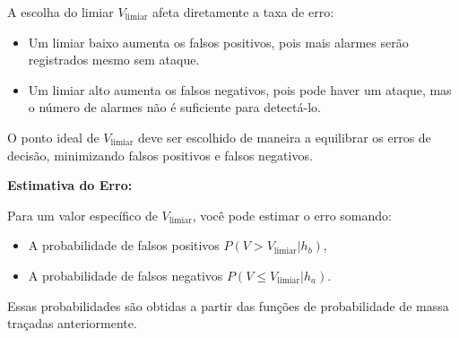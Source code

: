 \documentclass[12 pt]{article}
\begin{document}
\begin{enumerate}
\begin{tcolorbox}[colback=white, colframe=black, title=Resposta (continuação):]
        A escolha do limiar \( V_{\text{limiar}} \) afeta diretamente a taxa de erro:

        \begin{itemize}
            \item Um limiar baixo aumenta os falsos positivos, pois mais alarmes serão registrados mesmo sem ataque.
            \item Um limiar alto aumenta os falsos negativos, pois pode haver um ataque, mas o número de alarmes não é suficiente para detectá-lo.
        \end{itemize}
        
        O ponto ideal de \( V_{\text{limiar}} \) deve ser escolhido de maneira a equilibrar os erros de decisão, minimizando falsos positivos e falsos negativos.
        
        \textbf{Estimativa do Erro:}
        
        Para um valor específico de \( V_{\text{limiar}} \), você pode estimar o erro somando:
        \begin{itemize}
            \item A probabilidade de falsos positivos \( P(V > V_{\text{limiar}} | h_b) \),
            \item A probabilidade de falsos negativos \( P(V \leq V_{\text{limiar}} | h_a) \).
        \end{itemize}

        Essas probabilidades são obtidas a partir das funções de probabilidade de massa traçadas anteriormente.
        
    
    \end{tcolorbox}


\end{enumerate}





\end{document}
